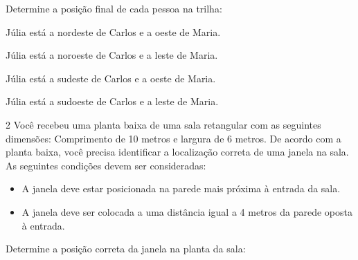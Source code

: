 Determine a posição final de cada pessoa na trilha:

\begin{escolha}[itemsep=5pt]
\item
  Júlia está a nordeste de Carlos e a oeste de Maria.
\item
  Júlia está a noroeste de Carlos e a leste de Maria.
\item
  Júlia está a sudeste de Carlos e a oeste de Maria.
\item
  Júlia está a sudoeste de Carlos e a leste de Maria.
\end{escolha}



\num{2} Você recebeu uma planta baixa de uma sala retangular com as seguintes
dimensões: Comprimento de 10 metros e largura de 6 metros. De acordo com a planta baixa, você precisa identificar a localização correta de uma janela na sala. As seguintes condições devem ser
consideradas:

\begin{itemize}[itemsep=5pt]
\item A janela deve estar posicionada na parede mais próxima à entrada da
sala. 
\item A janela deve ser colocada a uma distância igual a 4 metros da
parede oposta à entrada.
\end{itemize}

Determine a posição correta da janela na planta da sala:

